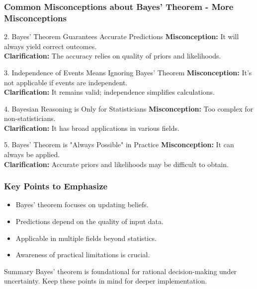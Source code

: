 \documentclass[aspectratio=169]{beamer}
\begin{document}
\begin{frame}[fragile]
    \frametitle{Common Misconceptions about Bayes' Theorem - More Misconceptions}

    \begin{block}{2. Bayes' Theorem Guarantees Accurate Predictions}
        \textbf{Misconception:} It will always yield correct outcomes.\\
        \textbf{Clarification:} The accuracy relies on quality of priors and likelihoods.
    \end{block}

    \begin{block}{3. Independence of Events Means Ignoring Bayes' Theorem}
        \textbf{Misconception:} It's not applicable if events are independent.\\
        \textbf{Clarification:} It remains valid; independence simplifies calculations.
    \end{block}

    \begin{block}{4. Bayesian Reasoning is Only for Statisticians}
        \textbf{Misconception:} Too complex for non-statisticians.\\
        \textbf{Clarification:} It has broad applications in various fields.
    \end{block}

    \begin{block}{5. Bayes' Theorem is "Always Possible" in Practice}
        \textbf{Misconception:} It can always be applied.\\
        \textbf{Clarification:} Accurate priors and likelihoods may be difficult to obtain.
    \end{block}
\end{frame}

\begin{frame}[fragile]
    \frametitle{Key Points to Emphasize}

    \begin{itemize}
        \item Bayes' theorem focuses on updating beliefs.
        \item Predictions depend on the quality of input data.
        \item Applicable in multiple fields beyond statistics.
        \item Awareness of practical limitations is crucial.
    \end{itemize}
    
    \begin{block}{Summary}
        Bayes' theorem is foundational for rational decision-making under uncertainty. Keep these points in mind for deeper implementation.
    \end{block}
\end{frame}
\end{document}
